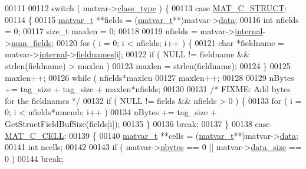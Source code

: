 \begin{DoxyCode}
00111 
00112     \textcolor{keywordflow}{switch} ( matvar->\hyperlink{group___m_a_t_aff13035bf3265dd7d9425e5d40c839d4}{class\_type} ) \{
00113         \textcolor{keywordflow}{case} \hyperlink{group___m_a_t_ggad4d60ae7b709fc81bfd744fb4c857c40acb467c7749c80902b798134c729bb521}{MAT\_C\_STRUCT}:
00114         \{
00115             \hyperlink{group___m_a_t_structmatvar__t}{matvar\_t} **fields = (\hyperlink{group___m_a_t_structmatvar__t}{matvar\_t}**)matvar->\hyperlink{group___m_a_t_a5672978efa230bbdecdf38ede781f7fa}{data};
00116             \textcolor{keywordtype}{int} nfields = 0;
00117             \textcolor{keywordtype}{size\_t} maxlen = 0;
00118 
00119             nfields = matvar->\hyperlink{group___m_a_t_a6e97e3ed9f40c49322c18561c2a94e92}{internal}->\hyperlink{structmatvar__internal_a93fc447484f455eddf9334f2e9e411c2}{num\_fields};
00120             for ( i = 0; i < nfields; i++ ) \{
00121                 \textcolor{keywordtype}{char} *fieldname = matvar->\hyperlink{group___m_a_t_a6e97e3ed9f40c49322c18561c2a94e92}{internal}->\hyperlink{structmatvar__internal_a7574d000bfc98ad4860ae6590b8d4985}{fieldnames}[i];
00122                 \textcolor{keywordflow}{if} ( NULL != fieldname && strlen(fieldname) > maxlen )
00123                     maxlen = strlen(fieldname);
00124             \}
00125             maxlen++;
00126             \textcolor{keywordflow}{while} ( nfields*maxlen %
00127                 maxlen++;
00128 
00129             nBytes += tag\_size + tag\_size + maxlen*nfields;
00130 
00131             \textcolor{comment}{/* FIXME: Add bytes for the fieldnames */}
00132             \textcolor{keywordflow}{if} ( NULL != fields && nfields > 0 ) \{
00133                 \textcolor{keywordflow}{for} ( i = 0; i < nfields*nmemb; i++ )
00134                     nBytes += tag\_size + GetStructFieldBufSize(fields[i]);
00135             \}
00136             \textcolor{keywordflow}{break};
00137         \}
00138         \textcolor{keywordflow}{case} \hyperlink{group___m_a_t_ggad4d60ae7b709fc81bfd744fb4c857c40a2f7abb47a1c51e248bd4e5e03cc81b08}{MAT\_C\_CELL}:
00139         \{
00140             \hyperlink{group___m_a_t_structmatvar__t}{matvar\_t} **cells = (\hyperlink{group___m_a_t_structmatvar__t}{matvar\_t}**)matvar->\hyperlink{group___m_a_t_a5672978efa230bbdecdf38ede781f7fa}{data};
00141             \textcolor{keywordtype}{int} ncells;
00142 
00143             if ( matvar->\hyperlink{group___m_a_t_abf1c844540503be2df9bb3db93cfe307}{nbytes} == 0 || matvar->\hyperlink{group___m_a_t_a9ad1c82e2b568da617e12dc73a26e1f9}{data\_size} == 0 )
00144                 \textcolor{keywordflow}{break};

\end{DoxyCode}
